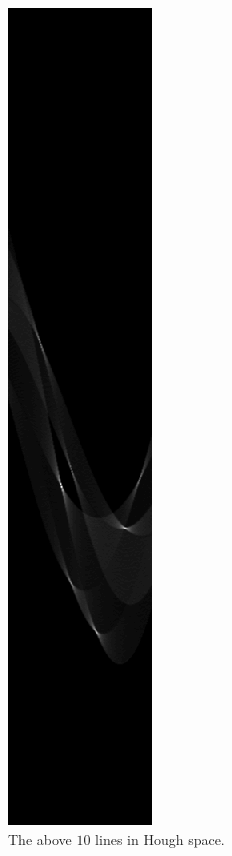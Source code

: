     \begin{figure}[H]
      \centering
      \includegraphics[scale=0.8]{./images/Q8/houghtest256/2.png}
      \caption{The above $10$ lines in Hough space.}
      \label{fig:Q8_houghtest256}
    \end{figure}

